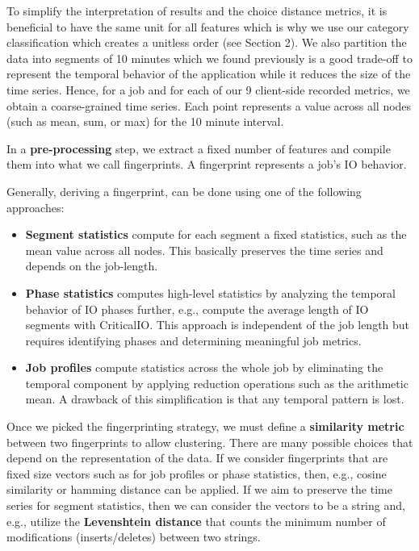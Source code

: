 \documentclass[]{llncs}
\begin{document}
To simplify the interpretation of results and the choice distance metrics, it is beneficial to have the same unit for all features which is why we use our category classification which creates a unitless order (see Section 2).
We also partition the data into segments of 10 minutes which we found previously is a good trade-off to represent the temporal behavior of the application while it reduces the size of the time series.
Hence, for a job and for each of our 9 client-side recorded metrics, we obtain a coarse-grained time series.
Each point represents a value across all nodes (such as mean, sum, or max) for the 10 minute interval.

In a \textbf{pre-processing} step, we extract a fixed number of features and compile them into what we call fingerprints.
A fingerprint represents a job’s IO behavior.

Generally, deriving a fingerprint, can be done using one of the following approaches:


\begin{itemize}
 \item \textbf{Segment statistics} compute for each segment a fixed statistics, such as the mean value across all nodes.
This basically preserves the time series and depends on the job-length.
 \item \textbf{Phase statistics} computes high-level statistics by analyzing the temporal behavior of IO phases further, e.g., compute the average length of IO segments with CriticalIO.
This approach is independent of the job length but requires identifying phases and determining meaningful job metrics.
 \item \textbf{Job profiles} compute statistics across the whole job by eliminating the temporal component by applying reduction operations such as the arithmetic mean.
A drawback of this simplification is that any temporal pattern is lost.
\end{itemize}

Once we picked the fingerprinting strategy, we must define a \textbf{similarity metric} between two fingerprints to allow clustering.
There are many possible choices that depend on the representation of the data.
If we consider fingerprints that are fixed size vectors such as for job profiles or phase statistics, then, e.g., cosine similarity or hamming distance can be applied.
If we aim to preserve the time series for segment statistics, then we can consider the vectors to be a string and, e.g., utilize the \textbf{Levenshtein distance} that counts the minimum number of modifications (inserts/deletes) between two strings.
\end{document}
